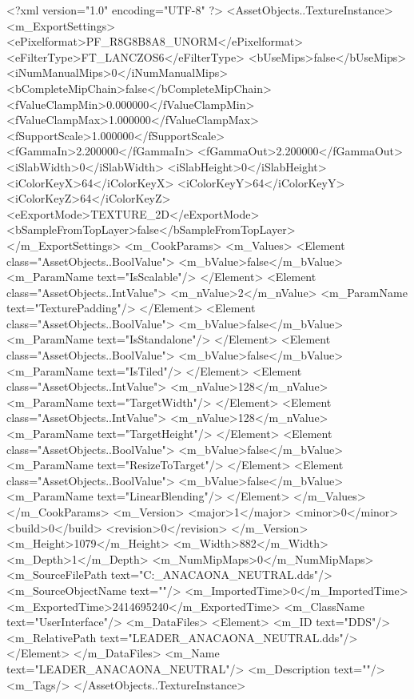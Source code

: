 <?xml version="1.0" encoding="UTF-8" ?>
<AssetObjects..TextureInstance>
	<m_ExportSettings>
		<ePixelformat>PF_R8G8B8A8_UNORM</ePixelformat>
		<eFilterType>FT_LANCZOS6</eFilterType>
		<bUseMips>false</bUseMips>
		<iNumManualMips>0</iNumManualMips>
		<bCompleteMipChain>false</bCompleteMipChain>
		<fValueClampMin>0.000000</fValueClampMin>
		<fValueClampMax>1.000000</fValueClampMax>
		<fSupportScale>1.000000</fSupportScale>
		<fGammaIn>2.200000</fGammaIn>
		<fGammaOut>2.200000</fGammaOut>
		<iSlabWidth>0</iSlabWidth>
		<iSlabHeight>0</iSlabHeight>
		<iColorKeyX>64</iColorKeyX>
		<iColorKeyY>64</iColorKeyY>
		<iColorKeyZ>64</iColorKeyZ>
		<eExportMode>TEXTURE_2D</eExportMode>
		<bSampleFromTopLayer>false</bSampleFromTopLayer>
	</m_ExportSettings>
	<m_CookParams>
		<m_Values>
			<Element class="AssetObjects..BoolValue">
				<m_bValue>false</m_bValue>
				<m_ParamName text="IsScalable"/>
			</Element>
			<Element class="AssetObjects..IntValue">
				<m_nValue>2</m_nValue>
				<m_ParamName text="TexturePadding"/>
			</Element>
			<Element class="AssetObjects..BoolValue">
				<m_bValue>false</m_bValue>
				<m_ParamName text="IsStandalone"/>
			</Element>
			<Element class="AssetObjects..BoolValue">
				<m_bValue>false</m_bValue>
				<m_ParamName text="IsTiled"/>
			</Element>
			<Element class="AssetObjects..IntValue">
				<m_nValue>128</m_nValue>
				<m_ParamName text="TargetWidth"/>
			</Element>
			<Element class="AssetObjects..IntValue">
				<m_nValue>128</m_nValue>
				<m_ParamName text="TargetHeight"/>
			</Element>
			<Element class="AssetObjects..BoolValue">
				<m_bValue>false</m_bValue>
				<m_ParamName text="ResizeToTarget"/>
			</Element>
			<Element class="AssetObjects..BoolValue">
				<m_bValue>false</m_bValue>
				<m_ParamName text="LinearBlending"/>
			</Element>
		</m_Values>
	</m_CookParams>
	<m_Version>
		<major>1</major>
		<minor>0</minor>
		<build>0</build>
		<revision>0</revision>
	</m_Version>
	<m_Height>1079</m_Height>
	<m_Width>882</m_Width>
	<m_Depth>1</m_Depth>
	<m_NumMipMaps>0</m_NumMipMaps>
	<m_SourceFilePath text="C:\Users\sardo\Downloads\LEADER_ANACAONA_NEUTRAL.dds"/>
	<m_SourceObjectName text=""/>
	<m_ImportedTime>0</m_ImportedTime>
	<m_ExportedTime>2414695240</m_ExportedTime>
	<m_ClassName text="UserInterface"/>
	<m_DataFiles>
		<Element>
			<m_ID text="DDS"/>
			<m_RelativePath text="LEADER_ANACAONA_NEUTRAL.dds"/>
		</Element>
	</m_DataFiles>
	<m_Name text="LEADER_ANACAONA_NEUTRAL"/>
	<m_Description text=""/>
	<m_Tags/>
</AssetObjects..TextureInstance>

